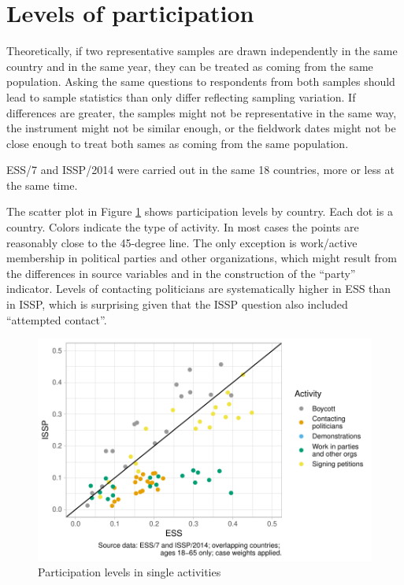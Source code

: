 \documentclass[12pt,]{article}
\begin{document}
\hypertarget{levels-of-participation}{%
\section{Levels of participation}\label{levels-of-participation}}

Theoretically, if two representative samples are drawn independently in the same country and in the same year, they can be treated as coming from the same population. Asking the same questions to respondents from both samples should lead to sample statistics than only differ reflecting sampling variation. If differences are greater, the samples might not be representative in the same way, the instrument might not be similar enough, or the fieldwork dates might not be close enough to treat both sames as coming from the same population.

ESS/7 and ISSP/2014 were carried out in the same 18 countries, more or less at the same time.

The scatter plot in Figure \ref{fig:part-rate-dot-plot} shows participation levels by country. Each dot is a country. Colors indicate the type of activity. In most cases the points are reasonably close to the 45-degree line. The only exception is work/active membership in political parties and other organizations, which might result from the differences in source variables and in the construction of the ``party'' indicator. Levels of contacting politicians are systematically higher in ESS than in ISSP, which is surprising given that the ISSP question also included ``attempted contact''.

\begin{figure}[H]

{\centering \includegraphics{paper_files/figure-latex/part-rate-dot-plot-1} 

}

\caption{Participation levels in single activities}\label{fig:part-rate-dot-plot}
\end{figure}
\end{document}
